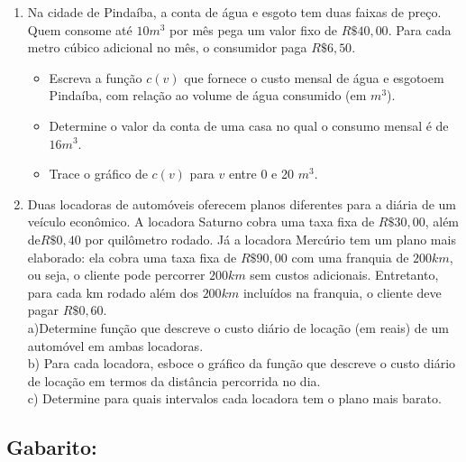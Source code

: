 \begin{enumerate}
\item Na cidade de Pindaíba, a conta de água e esgoto tem duas faixas de preço. Quem consome até $10 m^3$ por mês pega um valor fixo de $R\$ 40,00$. Para cada metro cúbico adicional no mês, o consumidor paga $R\$6,50$.
\begin{itemize}
\item[a)] Escreva a função $c(v)$ que fornece o custo mensal de água e esgotoem Pindaíba, com relação ao volume de água consumido (em $m^3$).
\item[b)] Determine o valor da conta de uma casa no qual o consumo mensal é de $16m^3$.
\item[c)]Trace o gráfico de $c(v)$ para $v$ entre 0 e 20 $m^3$.
\end{itemize}
\item Duas locadoras de automóveis oferecem planos
diferentes para a diária de um veículo econômico. A
locadora Saturno cobra uma taxa fixa de $R\$ 30,00$, além
de$ R\$ 0,40$ por quilômetro rodado. Já a locadora
Mercúrio tem um plano mais elaborado: ela cobra uma
taxa fixa de $R\$ 90,00$ com uma franquia de $200 km$, ou
seja, o cliente pode percorrer $200 km$ sem custos adicionais. Entretanto, para cada km rodado além dos $200 km$
incluídos na franquia, o cliente deve pagar $R\$ 0,60$. \\

a)Determine  função que descreve o custo diário de locação (em reais) de um automóvel em ambas locadoras. \\
b) Para cada locadora, esboce o gráfico da
função que descreve o custo diário de locação em
termos da distância percorrida no dia. \\
c) Determine para quais intervalos cada locadora tem o
plano mais barato.
\end{enumerate}

\subsection{Gabarito:}

